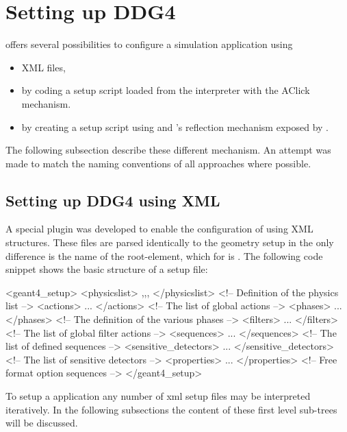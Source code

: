 
\section{Setting up DDG4}
\label{sec:ddg4-implementation-setup}

\noindent
\DDG offers several possibilities to configure a simulation application
using
\begin{itemize}\itemcompact
\item XML files,
\item by coding a setup script loaded from the  interpreter 
	with the AClick	mechanism.
\item by creating a setup script using  and 
	's reflection mechanism exposed by .
\end{itemize}
The following subsection describe these different mechanism. An attempt was made
to match the naming conventions of all approaches where possible.

\subsection{Setting up DDG4 using XML}
\label{sec:ddg4-implementation-setup-xml}

\noindent
A special plugin was developed to enable the configuration of \DDG using
XML structures. These files are parsed identically to the geometry setup
in \DDhep the only difference is the name of the root-element, which for 
\DDG is . 
The following code snippet shows the basic structure of a \DDG setup file:
\begin{unnumberedcode}
<geant4_setup>
  <physicslist>          ,,,  </physicslist>  <!-- Definition of the physics list          -->
  <actions>              ...  </actions>      <!-- The list of global actions              -->
  <phases>               ...  </phases>       <!-- The definition of the various phases    -->
  <filters>              ...  </filters>      <!-- The list of global filter actions       -->
  <sequences>            ...  </sequences>    <!-- The list of defined sequences           -->
  <sensitive_detectors>  ...  </sensitive_detectors>  <!-- The list of sensitive detectors -->
  <properties>           ...  </properties>   <!-- Free format option sequences            -->
</geant4_setup>
\end{unnumberedcode}
To setup a  application any number of xml setup files may be interpreted 
iteratively. In the following subsections the content of these first level sub-trees will
be discussed.

